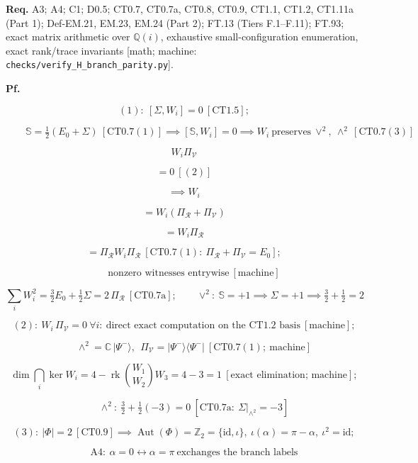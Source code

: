 \begin{theorem}
\textbf{Req.} A3; A4; C1; D0.5; CT0.7, CT0.7a, CT0.8, CT0.9, CT1.1, CT1.2, CT1.11a (Part 1); Def-EM.21, EM.23, EM.24 (Part 2); FT.13 (Tiers F.1–F.11); FT.93; exact matrix arithmetic over $\mathbb Q(i)$, exhaustive small-configuration enumeration, exact rank/trace invariants [math; machine: \texttt{checks/\allowbreak{}verify\_\allowbreak{}H\_\allowbreak{}branch\_\allowbreak{}parity.py}].

\textbf{Pf.}

\[
(1):\ [\Sigma,W_i]=0\ [\mathrm{CT1.5}];
\]

\[
\qquad \mathbb S=\tfrac12(E_0+\Sigma)\ [\mathrm{CT0.7}(1)]\implies[\mathbb S,W_i]=0\implies W_i\ \text{preserves}\ \vee^2,\ \wedge^2\ [\mathrm{CT0.7}(3)]
\]

\[
W_i\Pi_{\mathcal V}
\]

\[
= 0\ [(2)]
\]

\[
\implies W_i
\]

\[
= W_i(\Pi_{\mathcal R}+\Pi_{\mathcal V})
\]

\[
= W_i\Pi_{\mathcal R}
\]

\[
= \Pi_{\mathcal R}W_i\Pi_{\mathcal R}\ [\mathrm{CT0.7}(1):\ \Pi_{\mathcal R}+\Pi_{\mathcal V}=E_0];
\]

\[
\qquad \text{nonzero witnesses entrywise}\ [\text{machine}]
\]

\[
\textstyle\sum_iW_i^2=\tfrac32E_0+\tfrac12\Sigma=2\,\Pi_{\mathcal R}\ [\mathrm{CT0.7a}];\qquad\vee^2:\ \mathbb S=+1\implies\Sigma=+1\implies\tfrac32+\tfrac12=2
\]

\[
(2):\ W_i\,\Pi_{\mathcal V}=0\ \forall i:\ \text{direct exact computation on the CT1.2 basis}\ [\text{machine}];
\]

\[
\qquad \wedge^2=\mathbb C\,|\Psi^-\rangle,\ \ \Pi_{\mathcal V}=|\Psi^-\rangle\langle\Psi^-|\ [\mathrm{CT0.7}(1);\ \text{machine}]
\]

\[
\dim\bigcap_i\ker W_i=4-\operatorname{rk}\binom{W_1}{W_2}{W_3}=4-3=1\ [\text{exact elimination; machine}];
\]

\[
\qquad \wedge^2:\ \tfrac32+\tfrac12(-3)=0\ [\mathrm{CT0.7a}:\ \Sigma|_{\wedge^2}=-3]
\]

\[
(3):\ |\Phi|=2\ [\mathrm{CT0.9}]\implies\operatorname{Aut}(\Phi)=\mathbb Z_2=\{\mathrm{id},\iota\},\ \iota(\alpha)=\pi-\alpha,\ \iota^2=\mathrm{id};
\]

\[
\qquad \mathrm{A4}:\ \alpha=0\leftrightarrow\alpha=\pi\ \text{exchanges the branch labels}
\]


\end{theorem}
